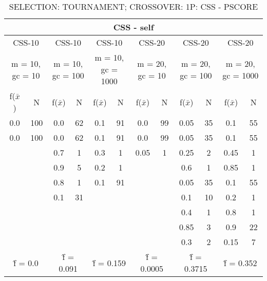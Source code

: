 \begin{table}[H]
	\centering
	\caption{SELECTION: TOURNAMENT; CROSSOVER: 1P: CSS - PSCORE}
	\begin{adjustbox}{width=1\textwidth}
		\begin{tabular}{ |c|c||c|c||c|c||c|c||c|c||c|c| }
			\hline
			\multicolumn{12}{|c|}{CSS - self} \\
			\hline
			\multicolumn{2}{|c||}{CSS-10} & \multicolumn{2}{c||}{CSS-10} & \multicolumn{2}{c||}{CSS-10} & \multicolumn{2}{c||}{CSS-20} & \multicolumn{2}{c||}{CSS-20} & \multicolumn{2}{c|}{CSS-20}\\
			\hline
			\multicolumn{2}{|c||}{m = 10, gc = 10} & \multicolumn{2}{c||}{m = 10, gc = 100} & \multicolumn{2}{c||}{m = 10, gc = 1000} & \multicolumn{2}{c||}{m = 20, gc = 10} & \multicolumn{2}{c||}{m = 20, gc = 100} & \multicolumn{2}{c|}{m = 20, gc = 1000}\\
			\hline
			f($\bar{x}$) & N & f($\bar{x}$) & N & f($\bar{x}$) & N & f($\bar{x}$) & N & f($\bar{x}$) & N & f($\bar{x}$) & N\\
			\hline
			\hline
			0.0 & 100 & 0.0 & 62 & 0.1 & 91 & 0.0 & 99 & 0.05 & 35 & 0.1 & 55\\
			\hline
			0.0 & 100 & 0.0 & 62 & 0.1 & 91 & 0.0 & 99 & 0.05 & 35 & 0.1 & 55\\
			&   & 0.7 & 1 & 0.3 & 1 & 0.05 & 1 & 0.25 & 2 & 0.45 & 1\\
			&   & 0.9 & 5 & 0.2 & 1 &   &   & 0.6 & 1 & 0.85 & 1\\
			&   & 0.8 & 1 & 0.1 & 91 &   &   & 0.05 & 35 & 0.1 & 55\\
			&   & 0.1 & 31 &   &   &   &   & 0.1 & 10 & 0.2 & 1\\
			&   &   &   &   &   &   &   & 0.4 & 1 & 0.8 & 1\\
			&   &   &   &   &   &   &   & 0.85 & 3 & 0.9 & 22\\
			&   &   &   &   &   &   &   & 0.3 & 2 & 0.15 & 7\\
			\hline
			\multicolumn{2}{|c||}{\^{f} = 0.0} & \multicolumn{2}{c||}{\^{f} = 0.091} & \multicolumn{2}{c||}{\^{f} = 0.159} & \multicolumn{2}{c||}{\^{f} = 0.0005} & \multicolumn{2}{c||}{\^{f} = 0.3715} & \multicolumn{2}{c|}{\^{f} = 0.352}\\
			\hline
		\end{tabular}
	\end{adjustbox}
\end{table}

